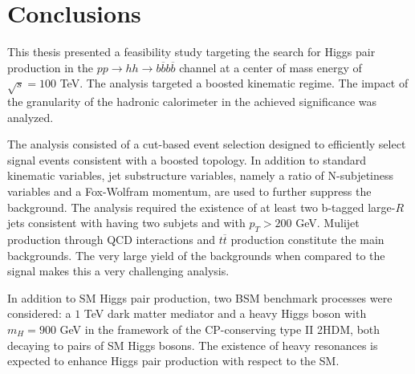 
\chapter{Conclusions}
\label{chapter:conclusions}

This thesis presented a feasibility study targeting the search for Higgs pair production in the $pp\rightarrow hh\rightarrow b\overline{b}b\overline{b}$ channel at a center of mass energy of $\sqrt{s}=100$ TeV. The analysis targeted a boosted kinematic regime. The impact of the granularity of the hadronic calorimeter in the achieved significance was analyzed.

The analysis consisted of a cut-based event selection designed to efficiently select signal events consistent with a boosted topology. In addition to standard kinematic variables, jet substructure variables, namely a ratio of N-subjetiness variables and a Fox-Wolfram momentum, are used to further suppress the background. The analysis required the existence of at least two b-tagged large-$R$ jets consistent with having two subjets and with $p_T>200$ GeV. Mulijet production through QCD interactions and $t\overline{t}$ production constitute the main backgrounds. The very large yield of the backgrounds when compared to the signal makes this a very challenging analysis.

In addition to SM Higgs pair production, two BSM benchmark processes were considered: a $1$ TeV dark matter mediator and a heavy Higgs boson with $m_H=900$ GeV in the framework of the CP-conserving type II 2HDM, both decaying to pairs of SM Higgs bosons. The existence of heavy resonances is expected to enhance Higgs pair production with respect to the SM.

